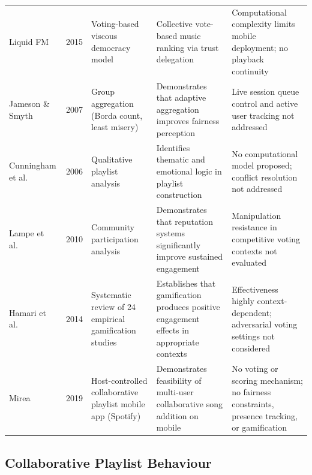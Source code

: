 \documentclass[pdflatex,sn-mathphys-num,iicol]{sn-jnl}
\theoremstyle{thmstyleone}%
\theoremstyle{thmstyletwo}%
\theoremstyle{thmstylethree}%
\begin{document}
\begin{table}[!ht]
\begin{tabular}{p{2.8cm} p{0.9cm} p{3.0cm} p{3.5cm} p{3.5cm}}
\addlinespace

Liquid FM~\cite{jamvote_arxiv_social_music}
& 2015
& Voting-based viscous democracy model
& Collective vote-based music ranking via trust delegation
& Computational complexity limits mobile deployment; no playback continuity \\

\addlinespace

Jameson \& Smyth~\cite{jamvote_recommendation_groups}
& 2007
& Group aggregation (Borda count, least misery)
& Demonstrates that adaptive aggregation improves fairness perception
& Live session queue control and active user tracking not addressed \\

\addlinespace

Cunningham et al.~\cite{jamvote_playlist_creation_art}
& 2006
& Qualitative playlist analysis
& Identifies thematic and emotional logic in playlist construction
& No computational model proposed; conflict resolution not addressed \\

\addlinespace

Lampe et al.~\cite{jamvote_online_community_motivation}
& 2010
& Community participation analysis
& Demonstrates that reputation systems significantly improve sustained engagement
& Manipulation resistance in competitive voting contexts not evaluated \\

\addlinespace

Hamari et al.~\cite{jamvote_gamification_works}
& 2014
& Systematic review of 24 empirical gamification studies
& Establishes that gamification produces positive engagement effects in appropriate contexts
& Effectiveness highly context-dependent; adversarial voting settings not considered \\

\addlinespace

Mirea~\cite{jamvote_queue_mirea}
& 2019
& Host-controlled collaborative playlist mobile app (Spotify)
& Demonstrates feasibility of multi-user collaborative song addition on mobile
& No voting or scoring mechanism; no fairness constraints, presence tracking, or gamification \\

\bottomrule
\end{tabular}
\end{table}

\subsection{Collaborative Playlist Behaviour}
\end{document}
